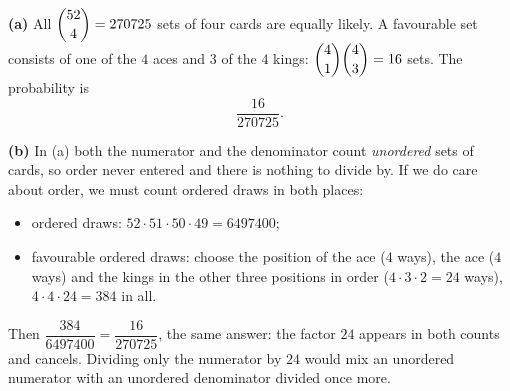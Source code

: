 \textbf{(a)} All $\dbinom{52}{4}=270725$ sets of four cards are equally likely. A favourable set consists of one of the $4$ aces and $3$ of the $4$ kings: $\dbinom41\dbinom43=16$ sets. The probability is
\[\boxed{\dfrac{16}{270725}}.\]

\textbf{(b)} In (a) both the numerator and the denominator count \emph{unordered} sets of cards, so order never entered and there is nothing to divide by. If we do care about order, we must count ordered draws in both places:
\begin{itemize}
\item ordered draws: $52\cdot51\cdot50\cdot49=6497400$;
\item favourable ordered draws: choose the position of the ace ($4$ ways), the ace ($4$ ways) and the kings in the other three positions in order ($4\cdot3\cdot2=24$ ways), $4\cdot4\cdot24=384$ in all.
\end{itemize}
Then $\dfrac{384}{6497400}=\dfrac{16}{270725}$, the same answer: the factor $24$ appears in both counts and cancels. Dividing only the numerator by $24$ would mix an unordered numerator with an unordered denominator divided once more.
